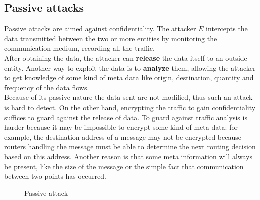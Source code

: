 \subsection{Passive attacks}
Passive attacks are aimed against confidentiality. The attacker $E$ intercepts the data transmitted between the two or more entities by monitoring the communication
medium, recording all the traffic. 
\\
After obtaining the data, the attacker can \textbf{release} the data itself to an outside entity. Another way to exploit the data is to \textbf{analyze} them,
allowing the attacker to get knowledge of some kind of meta data like origin, destination, quantity and frequency of the data flows. 
\\
Because of its passive nature the data sent are not modified, thus such an attack is hard to detect. On the other hand, encrypting the traffic to gain confidentiality suffices to guard
against the release of data. To guard against traffic analysis is harder because it may be impossible to encrypt some kind of meta data: for example, the destination address of a
message may not be encrypted because routers handling the message must be able to determine the next routing decision based on this address.
Another reason is that some meta information will always be present, like the size of the message or the simple fact that communication between two points has occurred.
\begin{figure}[h]
\centering
{}
\label{fig:passAttack}
\caption{Passive attack}
\end{figure}
